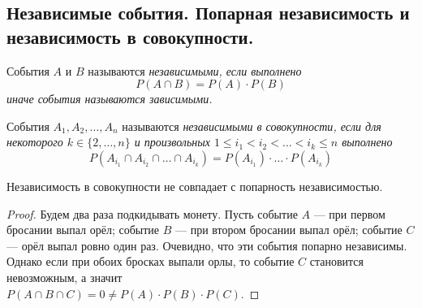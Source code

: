 \subsection{Независимые события. Попарная независимость и независимость в совокупности.}
\begin{definition}
    События $A$ и $B$ называются \it{независимыми}, если выполнено
    \[
        P(A \cap B) = P(A) \cdot P(B)
    \]
    иначе события называются \it{зависимыми}.
\end{definition}
\begin{definition}
    События $A_1, A_2, \ldots, A_n$ называются \it{независимыми в совокупности}, если
    для некоторого $k \in \{2, \ldots, n\}$ и произвольных $1 \leq i_1 < i_2 < \ldots < i_k \leq n$
    выполнено
    \[
        P(A_{i_1} \cap A_{i_2} \cap \ldots \cap A_{i_k}) =
        P(A_{i_1}) \cdot \ldots \cdot P(A_{i_k})
    \]
\end{definition}
\begin{proposal}
    Независимость в совокупности не совпадает с попарность независимостью.
\end{proposal}
\begin{proof}
    Будем два раза подкидывать монету. Пусть событие $A$ --- при первом бросании выпал орёл;
    событие $B$ --- при втором бросании выпал орёл; событие $C$ --- орёл выпал ровно один раз.
    Очевидно, что эти события попарно независимы. Однако если при обоих бросках выпали орлы, то
    событие $C$ становится невозможным, а значит\\ $P(A \cap B \cap C) = 0 \neq P(A) \cdot P(B)
    \cdot P(C)$.
\end{proof}

